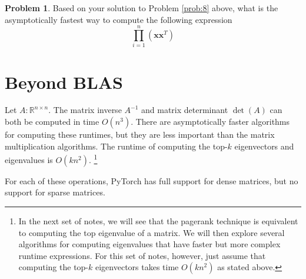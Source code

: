 \documentclass[10pt]{article}
\theoremstyle{definition}
\newtheorem{problem}{Problem}
\newcommand{\R}{\mathbb R}
\DeclareMathOperator{\determinant}{det}
\newcommand{\trans}[1]{{#1}^{T}}
\newcommand{\x}{\mathbf x}
\begin{document}
\begin{problem}
    Based on your solution to Problem \ref{prob:8} above,
    what is the asymptotically fastest way to compute the following expression
    \begin{equation}
        \prod_{i=1}^n (\x \trans \x)
    \end{equation}
    \vspace{2in}
\end{problem}


\newpage
\section{Beyond BLAS}

Let $A : \R^{n \times n}$.
The matrix inverse $A^{-1}$ and matrix determinant $\determinant(A)$ can both be computed in time $O(n^3)$.
There are asymptotically faster algorithms for computing these runtimes,
but they are less important than the matrix multiplication algorithms.
The runtime of computing the top-$k$ eigenvectors and eigenvalues is $O(kn^2)$.%
\footnote{
In the next set of notes, we will see that the pagerank technique is equivalent to computing the top eigenvalue of a matrix.
We will then explore several algorithms for computing eigenvalues that have faster but more complex runtime expressions.
For this set of notes, however, just assume that computing the top-$k$ eigenvectors takes time $O(kn^2)$ as stated above.
}

For each of these operations, PyTorch has full support for dense matrices,
but no support for sparse matrices.
\end{document}
